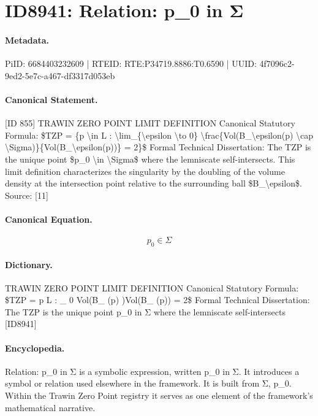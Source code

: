 \section*{ID8941: Relation: p\_0 in Σ}
\paragraph{Metadata.}
PiID: 6684403232609 | RTEID: RTE:P34719.8886:T0.6590 | UUID: 4f7096c2-9ed2-5e7c-a467-df3317d053eb

\paragraph{Canonical Statement.}
[ID 855] TRAWIN ZERO POINT LIMIT DEFINITION Canonical Statutory Formula: \$TZP = \{p \textbackslash{}in L : \textbackslash{}lim\_\{\textbackslash{}epsilon \textbackslash{}to 0\} \textbackslash{}frac\{Vol(B\_\textbackslash{}epsilon(p) \textbackslash{}cap \textbackslash{}Sigma)\}\{Vol(B\_\textbackslash{}epsilon(p))\} = 2\}\$ Formal Technical Dissertation: The TZP is the unique point \$p\_0 \textbackslash{}in \textbackslash{}Sigma\$ where the lemniscate self-intersects. This limit definition characterizes the singularity by the doubling of the volume density at the intersection point relative to the surrounding ball \$B\_\textbackslash{}epsilon\$. Source: [11]

\paragraph{Canonical Equation.}
\[
p_0 \in \Sigma
\]

\paragraph{Dictionary.}
TRAWIN ZERO POINT LIMIT DEFINITION Canonical Statutory Formula: \$TZP = p L : \_ 0 Vol(B\_ (p) )Vol(B\_ (p)) = 2\$ Formal Technical Dissertation: The TZP is the unique point p\_0 in Σ where the lemniscate self-intersects [ID8941]

\paragraph{Encyclopedia.}
Relation: p\_0 in Σ is a symbolic expression, written p\_0 in Σ. It introduces a symbol or relation used elsewhere in the framework. It is built from Σ, p\_0. Within the Trawin Zero Point registry it serves as one element of the framework's mathematical narrative.
